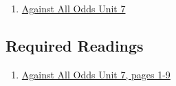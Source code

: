 \documentclass[letterpaper,12pt,twoside,printwatermark=false]{pinp}
\providecommand{\tightlist}{%
  \setlength{\itemsep}{0pt}\setlength{\parskip}{0pt}}
\begin{document}
\begin{enumerate}
\def\labelenumi{\arabic{enumi}.}
\tightlist
\item
  \href{https://www.learner.org/courses/againstallodds/unitpages/unit07.html}{Against
  All Odds Unit 7}
\end{enumerate}

\hypertarget{required-readings-2}{%
\subsection{Required Readings}\label{required-readings-2}}

\begin{enumerate}
\item \href{https://www.learner.org/courses/againstallodds/pdfs/AgainstAllOdds_StudentGuide_Unit07.pdf#page=1}{Against All Odds Unit 7, pages 1-9}
\end{enumerate}





\end{document}
